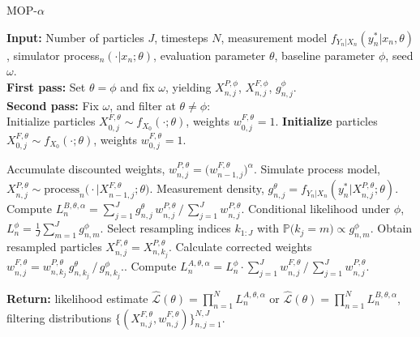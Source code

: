 \documentclass[11pt]{report}
\begin{document}
\begin{algorithm}[ht]
\caption{MOP-$\alpha$}
\textbf{Input:} Number of particles $J$, timesteps $N$, measurement model $f_{Y_n|X_n}(y_n^*|x_n, \theta)$, simulator process$_n(\cdot|x_n; \theta)$, evaluation parameter $\theta$, baseline parameter $\phi$, seed $\omega$. \\
\textbf{First pass:} Set $\theta = \phi$ and fix $\omega$, yielding $X_{n,j}^{P,\phi}$, $X_{n,j}^{F,\phi}$, $g^{\phi}_{n,j}$. \\
\textbf{Second pass:} Fix $\omega$, and filter at $\theta \neq \phi$: \\
Initialize particles $X_{0,j}^{F,\theta} \sim f_{X_0}(\cdot;\theta)$, weights $w_{0,j}^{F,\theta} = 1$.
\textbf{Initialize } particles ${X}_{0,j}^{F,\theta} \sim {f}_{{X}_{0}}\left(\cdot;{\theta}\right)$, weights $w^{F,\theta}_{0,j}= 1$. \\
\begin{algorithmic}[1]
\State Accumulate discounted weights, $w_{n,j}^{P,\theta} = \big(w_{n-1,j}^{F,\theta}\big)^\alpha$.
\State Simulate process model, $X_{n,j}^{P,\theta} \sim \text{process}_n\big(\cdot|{X}_{n-1,j}^{F, \theta};{\theta}\big)$.
\State Measurement density, $g^{\theta}_{n,j}={f}_{{Y}_{n}|{X}_{n}}(y_{n}^{*}|{X}_{n,j}^{P,\theta};{\theta})$.
\State Compute $L_n^{B,\theta,\alpha} ={\sum_{j=1}^Jg^\theta_{n,j} \, w^{P,\theta}_{n,j}}\, \big/\, {\sum_{j=1}^J  w^{P,\theta}_{n,j}}$.
\State Conditional likelihood under $\phi$, $L_n^{\phi} = \frac{1}{J}\sum_{m=1}^{J}g^{\phi}_{n,m}$.
\State Select resampling indices $k_{1:J}$ with $\mathbb{P}\big(k_{j}=m\big) \propto g^{\phi}_{n,m}$.
\State Obtain resampled particles ${X}_{n,j}^{F,\theta}={X}_{n,k_{j}}^{P,\theta}$.
\State Calculate corrected weights $w_{n,j}^{F,\theta}= w^{P,\theta}_{n,k_j} \, g^{\theta}_{n,k_j} \, \big/ \, { g^{\phi}_{n,k_j}}$..
\State Compute $L_n^{A,\theta,\alpha} = L_n^\phi\cdot {\sum_{j=1}^J w^{F,\theta}_{n,j}} \, \big/ \, {\sum_{j=1}^J  w^{P,\theta}_{n,j}}$.
\EndFor
\end{algorithmic}
\textbf{Return:} likelihood estimate $\hat{\mathcal{L}}(\theta) = \prod_{n=1}^N L_n^{A,\theta,\alpha}$ or $\hat{\mathcal{L}}(\theta) = \prod_{n=1}^N L_n^{B,\theta,\alpha}$, filtering distributions $\{(X_{n,j}^{F, \theta}, w^{F,\theta}_{n,j})\}_{n,j=1}^{N,J}$.
\end{algorithm}
\end{document}
